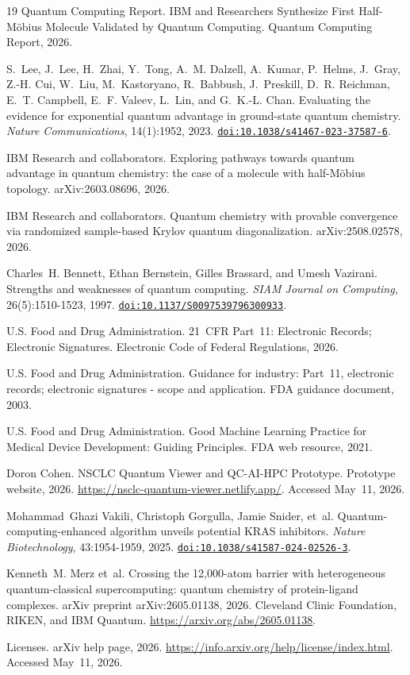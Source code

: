\documentclass[11pt,letterpaper]{article}
\newcommand{\doi}[1]{\href{https://doi.org/#1}{\texttt{doi:#1}}}
\begin{document}
\begin{thebibliography}{19}
Quantum Computing Report.
IBM and Researchers Synthesize First Half-M\"{o}bius Molecule Validated by Quantum Computing.
Quantum Computing Report, 2026.

S.~Lee, J.~Lee, H.~Zhai, Y.~Tong, A.~M. Dalzell, A.~Kumar, P.~Helms, J.~Gray, Z.-H. Cui, W.~Liu, M.~Kastoryano, R.~Babbush, J.~Preskill, D.~R. Reichman, E.~T. Campbell, E.~F. Valeev, L.~Lin, and G.~K.-L. Chan.
Evaluating the evidence for exponential quantum advantage in ground-state quantum chemistry.
\textit{Nature Communications}, 14(1):1952, 2023.
\doi{10.1038/s41467-023-37587-6}.

IBM Research and collaborators.
Exploring pathways towards quantum advantage in quantum chemistry: the case of a molecule with half-M\"{o}bius topology.
arXiv:2603.08696, 2026.

IBM Research and collaborators.
Quantum chemistry with provable convergence via randomized sample-based Krylov quantum diagonalization.
arXiv:2508.02578, 2026.

Charles~H. Bennett, Ethan Bernstein, Gilles Brassard, and Umesh Vazirani.
Strengths and weaknesses of quantum computing.
\textit{SIAM Journal on Computing}, 26(5):1510-1523, 1997.
\doi{10.1137/S0097539796300933}.

U.S. Food and Drug Administration.
21~CFR Part~11: Electronic Records; Electronic Signatures.
Electronic Code of Federal Regulations, 2026.

U.S. Food and Drug Administration.
Guidance for industry: Part~11, electronic records; electronic signatures - scope and application.
FDA guidance document, 2003.

U.S. Food and Drug Administration.
Good Machine Learning Practice for Medical Device Development: Guiding Principles.
FDA web resource, 2021.

Doron Cohen.
NSCLC Quantum Viewer and QC-AI-HPC Prototype.
Prototype website, 2026.
\url{https://nsclc-quantum-viewer.netlify.app/}.
Accessed May~11, 2026.

Mohammad~Ghazi Vakili, Christoph Gorgulla, Jamie Snider, et~al.
Quantum-computing-enhanced algorithm unveils potential KRAS inhibitors.
\textit{Nature Biotechnology}, 43:1954-1959, 2025.
\doi{10.1038/s41587-024-02526-3}.

Kenneth~M. Merz et~al.
Crossing the 12,000-atom barrier with heterogeneous quantum-classical supercomputing:
quantum chemistry of protein-ligand complexes.
arXiv preprint arXiv:2605.01138, 2026.
Cleveland Clinic Foundation, RIKEN, and IBM Quantum.
\url{https://arxiv.org/abs/2605.01138}.

Licenses.
arXiv help page, 2026.
\url{https://info.arxiv.org/help/license/index.html}.
Accessed May~11, 2026.

\end{thebibliography}
\end{document}
